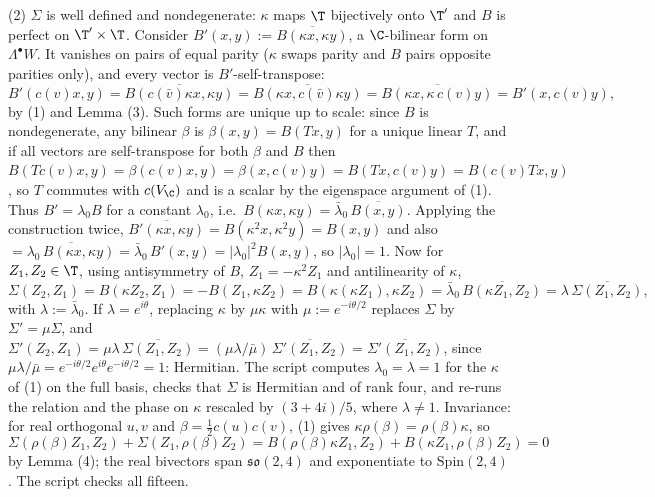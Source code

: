 (2) $\Sigma$ is well defined and nondegenerate: $\kappa$ maps $\T$ bijectively onto $\T'$ and $B$ is perfect on $\T'\times\T$. Consider $B'(x, y) := \overline{B(\kappa x, \kappa y)}$, a $\C$-bilinear form on $\Lambda^\bullet W$. It vanishes on pairs of equal parity ($\kappa$ swaps parity and $B$ pairs opposite parities only), and every vector is $B'$-self-transpose:
\[
B'(c(v)x, y) = \overline{B(c(\bar v)\kappa x, \kappa y)} = \overline{B(\kappa x, c(\bar v)\kappa y)} = \overline{B(\kappa x, \kappa\, c(v) y)} = B'(x, c(v) y),
\]
by (1) and Lemma (3). Such forms are unique up to scale: since $B$ is nondegenerate, any bilinear $\beta$ is $\beta(x,y) = B(Tx, y)$ for a unique linear $T$, and if all vectors are self-transpose for both $\beta$ and $B$ then $B(Tc(v)x, y) = \beta(c(v)x, y) = \beta(x, c(v)y) = B(Tx, c(v)y) = B(c(v)Tx, y)$, so $T$ commutes with $c(V_\C)$ and is a scalar by the eigenspace argument of (1). Thus $B' = \lambda_0 B$ for a constant $\lambda_0$, i.e.\ $B(\kappa x, \kappa y) = \bar\lambda_0\,\overline{B(x,y)}$. Applying the construction twice, $\overline{B'(\kappa x, \kappa y)} = B(\kappa^2 x, \kappa^2 y) = B(x, y)$ and also $= \overline{\lambda_0\,B(\kappa x, \kappa y)} = \bar\lambda_0\, B'(x,y) = |\lambda_0|^2 B(x,y)$, so $|\lambda_0| = 1$. Now for $Z_1, Z_2 \in \T$, using antisymmetry of $B$, $Z_1 = -\kappa^2 Z_1$ and antilinearity of $\kappa$,
\[
\Sigma(Z_2, Z_1) = B(\kappa Z_2, Z_1) = -B(Z_1, \kappa Z_2) = B(\kappa(\kappa Z_1), \kappa Z_2) = \bar\lambda_0\,\overline{B(\kappa Z_1, Z_2)} = \lambda\,\overline{\Sigma(Z_1, Z_2)},
\]
with $\lambda := \bar\lambda_0$.
If $\lambda = e^{i\theta}$, replacing $\kappa$ by $\mu\kappa$ with $\mu := e^{-i\theta/2}$ replaces $\Sigma$ by $\Sigma' = \mu\Sigma$, and $\Sigma'(Z_2,Z_1) = \mu\lambda\,\overline{\Sigma(Z_1,Z_2)} = (\mu\lambda/\bar\mu)\,\overline{\Sigma'(Z_1,Z_2)} = \overline{\Sigma'(Z_1,Z_2)}$, since $\mu\lambda/\bar\mu = e^{-i\theta/2}e^{i\theta}e^{-i\theta/2} = 1$: Hermitian. The script computes $\lambda_0 = \lambda = 1$ for the $\kappa$ of (1) on the full basis, checks that $\Sigma$ is Hermitian and of rank four, and re-runs the relation and the phase on $\kappa$ rescaled by $(3+4i)/5$, where $\lambda \neq 1$. Invariance: for real orthogonal $u, v$ and $\beta = \tfrac12 c(u)c(v)$, (1) gives $\kappa\rho(\beta) = \rho(\beta)\kappa$, so
\[
\Sigma(\rho(\beta)Z_1, Z_2) + \Sigma(Z_1, \rho(\beta)Z_2) = B(\rho(\beta)\kappa Z_1, Z_2) + B(\kappa Z_1, \rho(\beta) Z_2) = 0
\]
by Lemma (4); the real bivectors span $\mathfrak{so}(2,4)$ and exponentiate to $\mathrm{Spin}(2,4)$. The script checks all fifteen.

